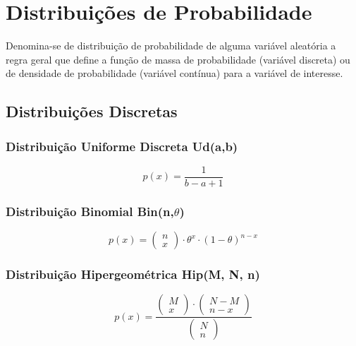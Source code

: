 \section{Distribuições de Probabilidade}

Denomina-se de distribuição de probabilidade de alguma variável aleatória a regra geral que define a função de massa de probabilidade (variável discreta) ou de densidade de probabilidade (variável contínua) para a variável de interesse.

\subsection{Distribuições Discretas}

\subsubsection{Distribuição Uniforme Discreta Ud(a,b)}

\begin{equation}
    p(x) = \frac{1}{b-a+1}
\end{equation}

\subsubsection{Distribuição Binomial Bin(n,$\theta$)}

\begin{equation}
    p(x) = \begin{pmatrix} n\\x \end{pmatrix} \cdot \theta^x \cdot (1-\theta)^{n-x}
\end{equation}

\subsubsection{Distribuição Hipergeométrica Hip(M, N, n)}

\begin{equation}
    p(x) = \frac{\begin{pmatrix} M\\x \end{pmatrix} \cdot \begin{pmatrix} N-M\\n-x \end{pmatrix}}{\begin{pmatrix} N\\n \end{pmatrix}}
\end{equation}

